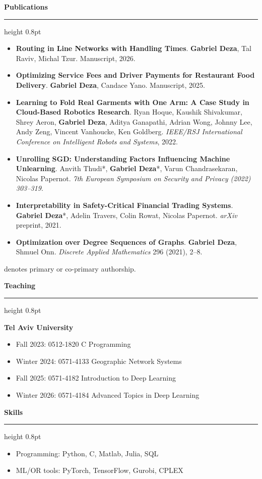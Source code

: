 \documentclass[10pt]{article}
\newcommand{\cvsection}[1]{%
  \vspace{0.7em}%
  {\large\bfseries #1}\par
  \vspace{0.15em}%
  {\color{SectionRule}\hrule height 0.8pt}%
  \vspace{0.35em}%
}
\begin{document}
\clearpage
\cvsection{Publications}
\begin{itemize}[leftmargin=0pt,label={},itemsep=0.45em]
  \item \textbf{Routing in Line Networks with Handling Times}. \textbf{Gabriel Deza}, Tal Raviv, Michal Tzur. Manuscript, 2026.
  \item \textbf{Optimizing Service Fees and Driver Payments for Restaurant Food Delivery}. \textbf{Gabriel Deza}, Candace Yano. Manuscript, 2025.
  \item \textbf{Learning to Fold Real Garments with One Arm: A Case Study in Cloud-Based Robotics Research}. Ryan Hoque, Kaushik Shivakumar, Shrey Aeron, \textbf{Gabriel Deza}, Aditya Ganapathi, Adrian Wong, Johnny Lee, Andy Zeng, Vincent Vanhoucke, Ken Goldberg. \textit{IEEE/RSJ International Conference on Intelligent Robots and Systems}, 2022.
  \item \textbf{Unrolling SGD: Understanding Factors Influencing Machine Unlearning}. Anvith Thudi*, \textbf{Gabriel Deza}*, Varun Chandrasekaran, Nicolas Papernot. \textit{7th European Symposium on Security and Privacy (2022) 303--319}.
  \item \textbf{Interpretability in Safety-Critical Financial Trading Systems}. \textbf{Gabriel Deza}*, Adelin Travers, Colin Rowat, Nicolas Papernot. \textit{arXiv} preprint, 2021.
  \item \textbf{Optimization over Degree Sequences of Graphs}. \textbf{Gabriel Deza}, Shmuel Onn. \textit{Discrete Applied Mathematics} 296 (2021), 2--8.
\end{itemize}
\vspace{-0.2em}
{\small * denotes primary or co-primary authorship.}\par

\cvsection{Teaching}
\textbf{Tel Aviv University}
\begin{itemize}
  \item Fall 2023: 0512-1820 C Programming
  \item Winter 2024: 0571-4133 Geographic Network Systems
  \item Fall 2025: 0571-4182 Introduction to Deep Learning
  \item Winter 2026: 0571-4184 Advanced Topics in Deep Learning
\end{itemize}

\cvsection{Skills}
\begin{itemize}
  \item Programming: Python, C, Matlab, Julia, SQL
  \item ML/OR tools: PyTorch, TensorFlow, Gurobi, CPLEX
\end{itemize}
\end{document}
